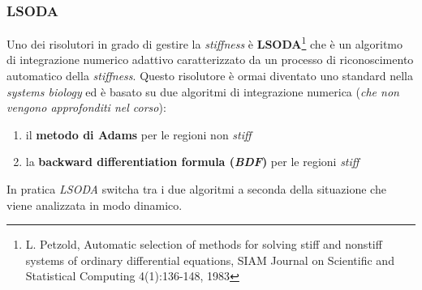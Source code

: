 \documentclass[a4paper,12pt, oneside]{book}
\begin{document}
\subsubsection{LSODA}
Uno dei risolutori in grado di gestire la \textit{stiffness} è
\textbf{LSODA}\footnote{L. Petzold, Automatic selection of methods for solving
  stiff and nonstiff systems of ordinary differential 
equations, SIAM Journal on Scientific and Statistical Computing 4(1):136-148,
1983}  che è un algoritmo di integrazione numerico adattivo caratterizzato da un
processo di riconoscimento automatico della \textit{stiffness}. Questo
risolutore è ormai diventato uno standard nella \textit{systems biology} ed è
basato su due algoritmi di integrazione numerica (\textit{che non vengono
  approfonditi nel corso}):
\begin{enumerate}
  \item il \textbf{metodo di Adams} per le regioni non \textit{stiff}
  \item la \textbf{backward differentiation formula (\textit{BDF})} per le
  regioni 
  \textit{stiff} 
\end{enumerate}
In pratica \textit{LSODA} switcha tra i due algoritmi a seconda della
situazione che viene analizzata in modo dinamico.  
\end{document}
